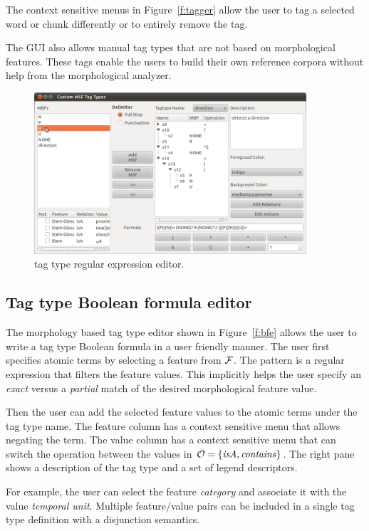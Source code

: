 The context sensitive menus in Figure~\ref{f:tagger} allow the user to tag 
a selected word or chunk differently or to entirely remove the tag.

The \framework GUI also allows manual tag types that are not based on morphological features.
These tags enable the users to build their own reference corpora without 
help from the morphological analyzer. 

\begin{figure}[tb]
  \centering
  \includegraphics[width=0.9\textwidth]{figures/msfedit}
  \caption{\framework tag type regular expression editor.}
  \label{f:sfe}
\end{figure}

\subsection{Tag type Boolean formula editor}
The morphology based tag type editor shown in Figure~\ref{f:bfe}
allows the user to write a tag type Boolean formula in a user friendly manner. 
The user first specifies atomic terms by selecting 
a feature from ${\cal F}$. 
The pattern is a regular expression that filters the feature values.
This implicitly helps the user specify 
an {\em exact} versus a {\em partial} match of the  desired 
morphological feature value.

Then the user can add the selected feature values to the atomic terms 
under the tag type name. 
The feature column has a context sensitive menu that allows negating 
the term.
The value column has a context sensitive menu that can switch the 
operation between the values in 
${\cal O} = \{ \mathit{isA}, \mathit{contains}\}$.
The right pane shows a description of the tag type and a set of legend 
descriptors. 

For example, the user can select the feature {\em category} and associate it 
with the value {\em temporal unit}. 
Multiple feature/value pairs can be included in a single tag type 
definition with a disjunction semantics. 

